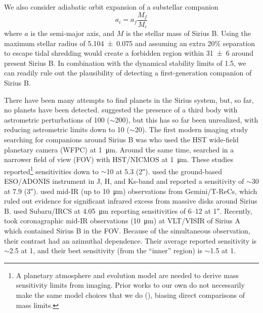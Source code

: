 \documentclass[twocolumn,linenumbers]{aastex631}
\begin{document}
We also consider adiabatic orbit expansion of a substellar companion
\begin{equation}
a_i = a_f \frac{M_{f}}{M_{i}}
\end{equation}
where $a$ is the semi-major axis, and $M$ is the stellar mass of Sirius B. Using the maximum stellar radius of \qty{5.104\pm0.075}{\au} and assuming an extra 20\% separation to escape tidal shredding \citep{nordhausOrbitsLowmassCompanions2013} would create a forbidden region within \qty{31\pm6}{\au} around present Sirius B. In combination with the dynamical stability limits of \qty{1.5}{\au}, we can readily rule out the plausibility of detecting a first-generation companion of Sirius B.

There have been many attempts to find planets in the Sirius system, but, so far, no planets have been detected. \citet{benestSiriusTripleStar1995} suggested the presence of a third body with astrometric perturbations of \qty{100}{\milliarcsecond} ($\sim$\qty{200}{\jupitermass}), but this has so far been unrealized, with \citet{bondSiriusSystemIts2017} reducing astrometric limits down to \qty{10}{\milliarcsecond} ($\sim$\qty{20}{\jupitermass}). The first modern imaging study searching for companions around Sirius B was \citet{schroederSearchFaintCompanions2000} who used the HST wide-field planetary camera (WFPC) at \qty{1}{\micro\meter}. Around the same time, \citet{kuchnerSearchExozodiacalDust2000} searched in a narrower field of view (FOV) with HST/NICMOS at \qty{1}{\micro\meter}. These studies reported\footnote{A planetary atmosphere and evolution model are needed to derive mass sensitivity limits from imaging. Prior works to our own do not necessarily make the same model choices that we do (), biasing direct comparisons of mass limits.} sensitivities down to $\sim$\qty{10}{\jupitermass} at \qty{5.3}{\au} (\ang{;;2}).  \citet{bonnet-bidaudADONISHighContrast2008a} used the ground-based ESO/ADONIS instrument in J, H, and Ks-band and reported a sensitivity of $\sim$\qty{30}{\jupitermass} at \qty{7.9}{\au} (\ang{;;3}). \citet{skemerSiriusImagedMidinfrared2011} used mid-IR (up to \qty{10}{\micro\meter}) observations from Gemini/T-ReCs, which ruled out evidence for significant infrared excess from massive disks around Sirius B. \citet{thalmannPiercingGlareDirect2011} used Subaru/IRCS at \qty{4.05}{\micro\meter} reporting sensitivities of \qtyrange{6}{12}{\jupitermass} at \ang{;;1}. Recently, \citet{pathakHighContrastImaging2021} took coronagraphic mid-IR observations (\qty{10}{\micro\meter}) at VLT/VISIR of Sirius A which contained Sirius B in the FOV. Because of the simultaneous observation, their contrast had an azimuthal dependence. Their average reported sensitivity is $\sim$\qty{2.5}{\jupitermass} at \qty{1}{\au}, and their best sensitivity (from the ``inner'' region) is $\sim$\qty{1.5}{\jupitermass} at \qty{1}{\au}.
\end{document}
